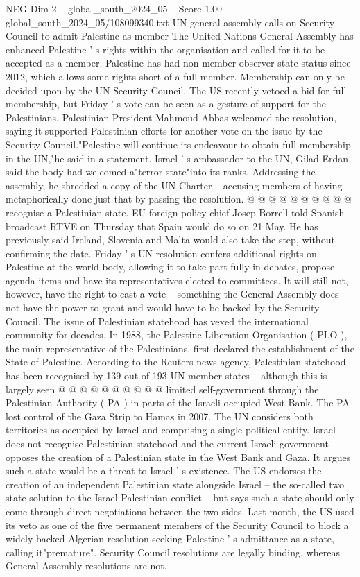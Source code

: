 \begin{textsample}{NEG Dim 2 – global\_south\_2024\_05 – Score 1.00 – global\_south\_2024\_05/108099340.txt}  \label{ex:f2_neg_223}
UN general assembly calls on Security Council to admit Palestine as member The United Nations General Assembly has enhanced Palestine ' s rights within the organisation and called for it to be accepted as a member.
Palestine has had non-member observer state status since 2012, which allows some rights short of a full member.
Membership can only be decided upon by the UN Security Council.
The US recently vetoed a bid for full membership, but Friday ' s vote can be seen as a gesture of support for the Palestinians.
Palestinian President Mahmoud Abbas welcomed the resolution, saying it supported Palestinian efforts for another vote on the issue by the Security Council."Palestine will continue its endeavour to obtain full membership in the UN,"he said in a statement.
Israel ' s ambassador to the UN, Gilad Erdan, said the body had welcomed a"terror state"into its ranks.
Addressing the assembly, he shredded a copy of the UN Charter -- accusing members of having metaphorically done just that by passing the resolution. @ @ @ @ @ @ @ @ @ @ recognise a Palestinian state.
EU foreign policy chief Josep Borrell told Spanish broadcast RTVE on Thursday that Spain would do so on 21 May.
He has previously said Ireland, Slovenia and Malta would also take the step, without confirming the date.
Friday ' s UN resolution confers additional rights on Palestine at the world body, allowing it to take part fully in debates, propose agenda items and have its representatives elected to committees.
It will still not, however, have the right to cast a vote -- something the General Assembly does not have the power to grant and would have to be backed by the Security Council.
The issue of Palestinian statehood has vexed the international community for decades.
In 1988, the Palestine Liberation Organisation ( PLO ), the main representative of the Palestinians, first declared the establishment of the State of Palestine.
According to the Reuters news agency, Palestinian statehood has been recognised by 139 out of 193 UN member states -- although this is largely seen @ @ @ @ @ @ @ @ @ @ limited self-government through the Palestinian Authority ( PA ) in parts of the Israeli-occupied West Bank.
The PA lost control of the Gaza Strip to Hamas in 2007.
The UN considers both territories as occupied by Israel and comprising a single political entity.
Israel does not recognise Palestinian statehood and the current Israeli government opposes the creation of a Palestinian state in the West Bank and Gaza.
It argues such a state would be a threat to Israel ' s existence.
The US endorses the creation of an independent Palestinian state alongside Israel -- the so-called two state solution to the Israel-Palestinian conflict -- but says such a state should only come through direct negotiations between the two sides.
Last month, the US used its veto as one of the five permanent members of the Security Council to block a widely backed Algerian resolution seeking Palestine ' s admittance as a state, calling it"premature".
Security Council resolutions are legally binding, whereas General Assembly resolutions are not.

\end{textsample}
